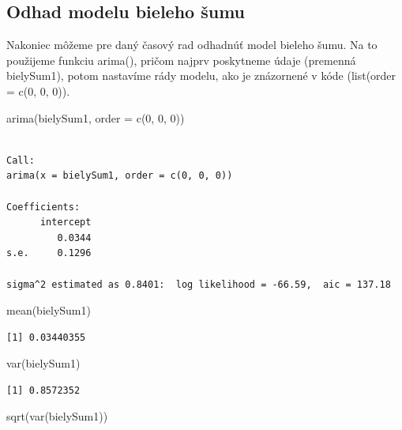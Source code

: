 \documentclass[
  letterpaper,
  DIV=11,
  numbers=noendperiod]{scrreprt}
\newenvironment{Shaded}{\begin{snugshade}}{\end{snugshade}}
\newcommand{\AttributeTok}[1]{\textcolor[rgb]{0.40,0.45,0.13}{#1}}
\newcommand{\DecValTok}[1]{\textcolor[rgb]{0.68,0.00,0.00}{#1}}
\newcommand{\FunctionTok}[1]{\textcolor[rgb]{0.28,0.35,0.67}{#1}}
\newcommand{\NormalTok}[1]{\textcolor[rgb]{0.00,0.23,0.31}{#1}}
\begin{document}
\subsection{Odhad modelu bieleho
šumu}\label{odhad-modelu-bieleho-ux161umu}

Nakoniec môžeme pre daný časový rad odhadnúť model bieleho šumu. Na to
použijeme funkciu arima(), pričom najprv poskytneme údaje (premenná
bielySum1), potom nastavíme rády modelu, ako je znázornené v kóde
(list(order = c(0, 0, 0)).

\begin{Shaded}
\begin{Highlighting}[]
\FunctionTok{arima}\NormalTok{(bielySum1, }\AttributeTok{order =} \FunctionTok{c}\NormalTok{(}\DecValTok{0}\NormalTok{, }\DecValTok{0}\NormalTok{, }\DecValTok{0}\NormalTok{))}
\end{Highlighting}
\end{Shaded}

\begin{verbatim}

Call:
arima(x = bielySum1, order = c(0, 0, 0))

Coefficients:
      intercept
         0.0344
s.e.     0.1296

sigma^2 estimated as 0.8401:  log likelihood = -66.59,  aic = 137.18
\end{verbatim}

\begin{Shaded}
\begin{Highlighting}[]
\FunctionTok{mean}\NormalTok{(bielySum1)}
\end{Highlighting}
\end{Shaded}

\begin{verbatim}
[1] 0.03440355
\end{verbatim}

\begin{Shaded}
\begin{Highlighting}[]
\FunctionTok{var}\NormalTok{(bielySum1)}
\end{Highlighting}
\end{Shaded}

\begin{verbatim}
[1] 0.8572352
\end{verbatim}

\begin{Shaded}
\begin{Highlighting}[]
\FunctionTok{sqrt}\NormalTok{(}\FunctionTok{var}\NormalTok{(bielySum1))}
\end{Highlighting}
\end{Shaded}
\end{document}
